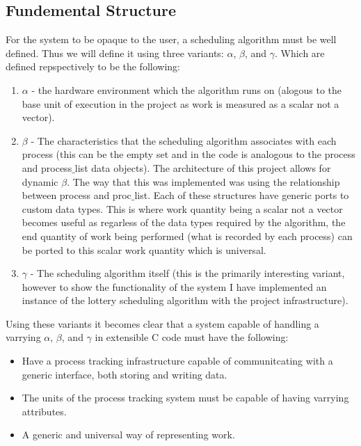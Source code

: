\documentclass[acmsmall]{acmart}
\begin{document}
\begin{multicols}{2}
    \subsection{Fundemental Structure}
    For the system to be opaque to the user, a scheduling algorithm must be
    well defined. Thus we will define it using three variants: $\alpha$,
    $\beta$, and $\gamma$. Which are defined repspectively to be the following:
    \begin{enumerate}
      \item $\alpha$ - the hardware environment which the algorithm runs on
        (alogous to the base unit of execution in the project as work is
        measured as a scalar not a vector).
      \item $\beta$ - The characteristics that the scheduling algorithm
        associates with each process (this can be the empty set and in the code
        is analogous to the process and process$\_$list data objects). The
        architecture of this project allows for dynamic $\beta$. The way that
        this was implemented was using the relationship between process and
        proc$\_$list. Each of these structures have generic ports to custom data
        types. This is where work quantity being a scalar not a vector becomes
        useful as regarless of the data types required by the algorithm, the end
        quantity of work being performed (what is recorded by each process) can
        be ported to this scalar work quantity which is universal.
      \item $\gamma$ - The scheduling algorithm itself (this is the primarily
        interesting variant, however to show the functionality of the system I
        have implemented an instance of the lottery scheduling algorithm with
        the project infrastructure).
    \end{enumerate}
    Using these variants it becomes clear that a system capable of handling a
    varrying $\alpha$, $\beta$, and $\gamma$ in extensible C code must have
    the following:
    \begin{itemize}
      \item Have a process tracking infrastructure capable of communitcating
        with a generic interface, both storing and writing data.
      \item The units of the process tracking system must be capable of having
        varrying attributes.
      \item A generic and universal way of representing work.
    \end{itemize}

\end{multicols}
\end{document}

